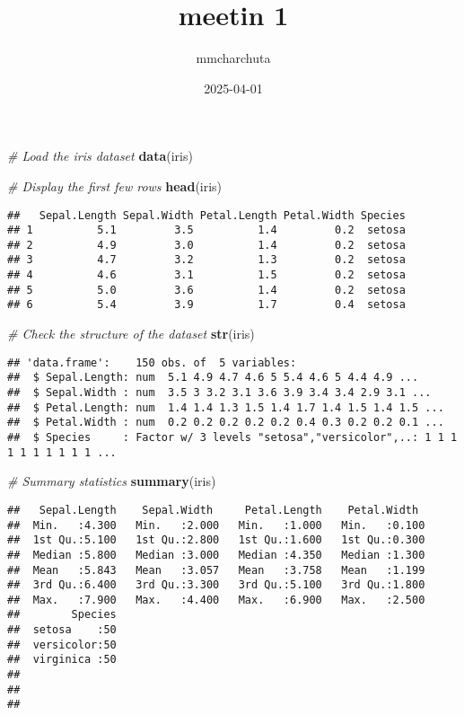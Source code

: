 \documentclass[
]{article}
\title{meetin 1}
\author{mmcharchuta}
\date{2025-04-01}
\newenvironment{Shaded}{\begin{snugshade}}{\end{snugshade}}
\newcommand{\CommentTok}[1]{\textcolor[rgb]{0.56,0.35,0.01}{\textit{#1}}}
\newcommand{\FunctionTok}[1]{\textcolor[rgb]{0.13,0.29,0.53}{\textbf{#1}}}
\newcommand{\NormalTok}[1]{#1}
\begin{document}
\maketitle

\begin{Shaded}
\begin{Highlighting}[]
\CommentTok{\# Load the iris dataset}
\FunctionTok{data}\NormalTok{(iris)}

\CommentTok{\# Display the first few rows}
\FunctionTok{head}\NormalTok{(iris)}
\end{Highlighting}
\end{Shaded}

\begin{verbatim}
##   Sepal.Length Sepal.Width Petal.Length Petal.Width Species
## 1          5.1         3.5          1.4         0.2  setosa
## 2          4.9         3.0          1.4         0.2  setosa
## 3          4.7         3.2          1.3         0.2  setosa
## 4          4.6         3.1          1.5         0.2  setosa
## 5          5.0         3.6          1.4         0.2  setosa
## 6          5.4         3.9          1.7         0.4  setosa
\end{verbatim}

\begin{Shaded}
\begin{Highlighting}[]
\CommentTok{\# Check the structure of the dataset}
\FunctionTok{str}\NormalTok{(iris)}
\end{Highlighting}
\end{Shaded}

\begin{verbatim}
## 'data.frame':    150 obs. of  5 variables:
##  $ Sepal.Length: num  5.1 4.9 4.7 4.6 5 5.4 4.6 5 4.4 4.9 ...
##  $ Sepal.Width : num  3.5 3 3.2 3.1 3.6 3.9 3.4 3.4 2.9 3.1 ...
##  $ Petal.Length: num  1.4 1.4 1.3 1.5 1.4 1.7 1.4 1.5 1.4 1.5 ...
##  $ Petal.Width : num  0.2 0.2 0.2 0.2 0.2 0.4 0.3 0.2 0.2 0.1 ...
##  $ Species     : Factor w/ 3 levels "setosa","versicolor",..: 1 1 1 1 1 1 1 1 1 1 ...
\end{verbatim}

\begin{Shaded}
\begin{Highlighting}[]
\CommentTok{\# Summary statistics}
\FunctionTok{summary}\NormalTok{(iris)}
\end{Highlighting}
\end{Shaded}

\begin{verbatim}
##   Sepal.Length    Sepal.Width     Petal.Length    Petal.Width   
##  Min.   :4.300   Min.   :2.000   Min.   :1.000   Min.   :0.100  
##  1st Qu.:5.100   1st Qu.:2.800   1st Qu.:1.600   1st Qu.:0.300  
##  Median :5.800   Median :3.000   Median :4.350   Median :1.300  
##  Mean   :5.843   Mean   :3.057   Mean   :3.758   Mean   :1.199  
##  3rd Qu.:6.400   3rd Qu.:3.300   3rd Qu.:5.100   3rd Qu.:1.800  
##  Max.   :7.900   Max.   :4.400   Max.   :6.900   Max.   :2.500  
##        Species  
##  setosa    :50  
##  versicolor:50  
##  virginica :50  
##                 
##                 
## 
\end{verbatim}
\end{document}

